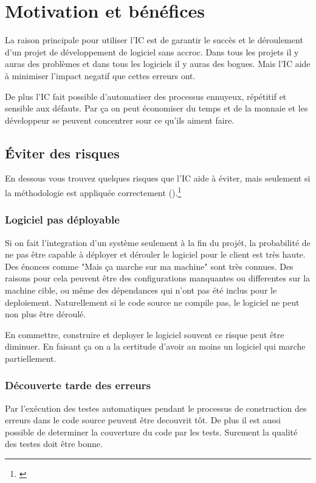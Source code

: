 \clearpage

\section{Motivation et bénéfices}

La raison principale pour utiliser l'IC est de garantir le succès et le déroulement d'un projet de développement de logiciel sans accroc. Dans tous les projets il y auras des problèmes et dans tous les logiciels il y auras des bogues. Mais l'IC aide à minimiser l'impact negatif que cettes erreurs ont.

De plus l'IC fait possible d'automatiser des processus ennuyeux, répétitif et sensible aux défauts. Par ça on peut économiser du temps et de la monnaie et les développeur se peuvent concentrer sour ce qu'ils aiment faire.

\subsection{Éviter des risques}
En dessous vous trouvez quelques risques que l'IC aide à éviter, mais seulement si la méthodologie est appliquée correctement ().\footnote{\cite[p39]{duvallconint}} 
\subsubsection{Logiciel pas déployable}
Si on fait l'integration d'un système seulement à la fin du projét, la probabilité de ne pas être capable à déployer et dérouler le logiciel pour le client est très haute. Des énonces comme "Mais ça marche sur ma machine" sont très connues. Des raisons pour cela peuvent être des configurations manquantes ou differentes sur la machine cible, ou même des dépendances qui n'ont pas été inclus pour le deploiement. Naturellement si le code source ne compile pas, le logiciel ne peut non plus être déroulé.

En commettre, construire et deployer le logiciel souvent ce risque peut être diminuer. En faisant ça on a la certitude d'avoir au moins un logiciel qui marche partiellement.
\subsubsection{Découverte tarde des erreurs}
Par l'exécution des testes automatiques pendant le processus de construction des erreurs dans le code source peuvent être decouvrit tôt. De plus il est aussi possible de determiner la couverture du code par les tests. Surement la qualité des testes doit être bonne.
